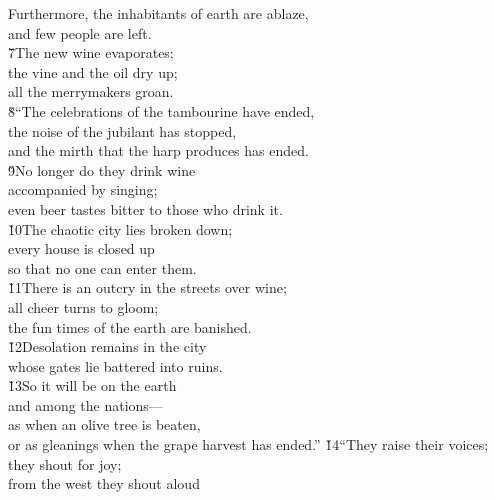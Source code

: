 \begin{poetry}
\poeml Furthermore, the inhabitants of earth are ablaze, \\
\poemll    and few people are left. \\
\poeml \v{7}The new wine evaporates; \\
\poemll    the vine and the oil dry up; \\
\poemlll       all the merrymakers groan. \\
\poeml \v{8}``The celebrations of the tambourine have ended, \\
\poemll    the noise of the jubilant has stopped, \\
\poemlll       and the mirth that the harp produces has ended. \\
\poeml \v{9}No longer do they drink wine \\
\poemll    accompanied by singing; \\
\poemlll       even beer tastes bitter to those who drink it. \\
\poeml \v{10}The chaotic city lies broken down; \\
\poemll    every house is closed up \\
\poemlll       so that no one can enter them. \\
\poeml \v{11}There is an outcry in the streets over wine; \\
\poemll    all cheer turns to gloom; \\
\poemlll       the fun times of the earth are banished. \\
\poeml \v{12}Desolation remains in the city \\
\poemll    whose gates lie battered into ruins. \\
\poeml \v{13}So it will be on the earth \\
\poemll    and among the nations--- \\
\poeml as when an olive tree is beaten, \\
\poemll    or as gleanings when the grape harvest has ended.''
\poeml \v{14}``They raise their voices; \\
\poemll    they shout for joy; \\
\poeml from the west they shout aloud \\

\end{poetry}
